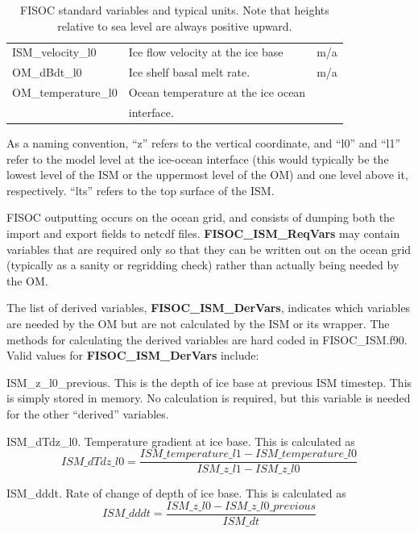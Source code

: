 \documentclass[12pt]{article}
\begin{document}
\begin{table}
\begin{center}
\begin{tabular}{ l|l|l }
      ISM\_velocity\_l0     & Ice flow velocity at the ice base            & m/a \\
      OM\_dBdt\_l0          & Ice shelf basal melt rate.                   & m/a \\
      OM\_temperature\_l0   & Ocean temperature at the ice ocean           &   \\
                            & interface.                                   &   \\
    \end{tabular}
  \end{center}
  \caption{FISOC standard variables and typical units.  
    Note that heights relative to sea level are always positive upward.}
  \label{tab:vars}
\end{table}

As a naming convention, ``z'' refers to the vertical coordinate, and ``l0'' and ``l1'' refer to the 
model level at the ice-ocean interface (this would typically be the lowest level of the ISM or 
the uppermost level of the OM) and one level above it, respectively. ``lts'' refers to the top 
surface of the ISM.

FISOC outputting occurs on the ocean grid, and consists of dumping both the import and 
export fields to netcdf files. 
\textbf{FISOC\_ISM\_ReqVars} may contain variables that are required only so that they can be written 
out on the ocean grid (typically as a sanity or regridding check) rather 
than actually being needed by the OM.

The list of derived variables, \textbf{FISOC\_ISM\_DerVars}, indicates which variables are needed by the 
OM but are not calculated by the ISM or its wrapper. 
The methods for calculating the derived variables are hard coded in FISOC\_ISM.f90. 
Valid values for  \textbf{FISOC\_ISM\_DerVars} include:

ISM\_z\_l0\_previous.  This is the depth of ice base at previous ISM timestep. This is simply stored 
in memory.  No calculation is required, but this variable is needed for the other ``derived'' variables. 

ISM\_dTdz\_l0.  Temperature gradient at ice base.  This is calculated as 
\begin{equation}
ISM\_dTdz\_l0 = \frac{ISM\_temperature\_l1 - ISM\_temperature\_l0}{ISM\_z\_l1 - ISM\_z\_l0}
\end{equation}

ISM\_dddt.  Rate of change of depth of ice base.  This is calculated as 
\begin{equation}
ISM\_dddt = \frac{ISM\_z\_l0 - ISM\_z\_l0\_previous}{ISM\_dt}
\end{equation}
\end{document}
